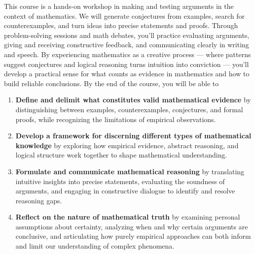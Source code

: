 \documentclass[oneside,11pt]{amsart}
\begin{document}
This course is a hands-on workshop in making and testing arguments in the context of mathematics.
We will generate conjectures from examples, search for counterexamples, and turn ideas into precise statements and proofs. Through problem-solving sessions and math debates, you'll practice evaluating arguments, giving and receiving constructive feedback, and communicating clearly in writing and speech. By experiencing mathematics as a creative process --- where patterns suggest conjectures and logical reasoning turns intuition into conviction --- you'll develop a practical sense for what counts as evidence in mathematics and how to build reliable conclusions.
By the end of the course, you will be able to
\begin{enumerate}
    \item \textbf{Define and delimit what constitutes valid mathematical evidence} by distinguishing between examples, counterexamples, conjectures, and formal proofs, while recognizing the limitations of empirical observations.
    \item \textbf{Develop a framework for discerning different types of mathematical knowledge} by exploring how empirical evidence, abstract reasoning, and logical structure work together to shape mathematical understanding.
    \item \textbf{Formulate and communicate mathematical reasoning} by translating intuitive insights into precise statements, evaluating the soundness of arguments, and engaging in constructive dialogue to identify and resolve reasoning gaps.
    \item \textbf{Reflect on the nature of mathematical truth} by examining personal assumptions about certainty, analyzing when and why certain arguments are conclusive, and articulating how purely empirical approaches can both inform and limit our understanding of complex phenomena.
\end{enumerate}
\end{document}
